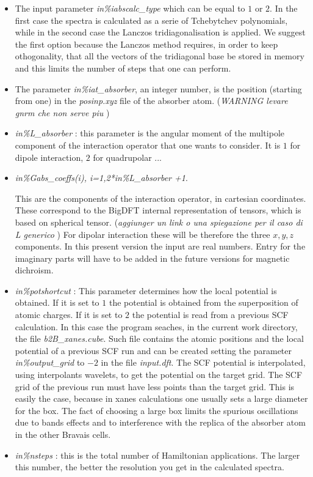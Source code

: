 \documentclass[a4paper,11pt]{report}
\begin{document}
\begin{itemize}
\item The input parameter {\it in\%iabscalc\_type} which can be equal to  $1$
or $2$. In the first case the spectra is calculated as a serie of
Tchebytchev polynomials, while in the second case the Lanczos
tridiagonalisation is applied. We suggest the first option
because the Lanczos method requires, in order to keep othogonality,
 that all the vectors of the tridiagonal base be stored in memory
and this limits the number of steps that one can perform.

\item The  parameter {\it in\%iat\_absorber}, an integer number,
is the position (starting from one) in  the {\it posinp.xyz} file
 of the absorber atom. ({\it WARNING levare gnrm che non serve piu} )

\item  {\it in\%L\_absorber} : this parameter is the angular moment
of the multipole component of the interaction operator that 
one wants to consider. It is $1$ for dipole interaction, $2$ for
quadrupolar ...

\item {\it in\%Gabs\_coeffs(i), i=1,2*in\%L\_absorber +1}.

This are the components of the interaction operator, in cartesian
coordinates. These correspond to the BigDFT internal representation 
of tensors, which is based on spherical tensor. 
({\it aggiunger un link o una spiegazione per il caso di L  generico })
For dipolar interaction these will be therefore the three $x,y,z$
components. In this present version the input are real numbers.
Entry for the imaginary parts will have to be added in the future versions 
for magnetic dichroism.

\item   {\it in\%potshortcut } : This parameter determines how the 
local potential is obtained. If it is set to $1$ the potential is
obtained from the superposition of atomic charges.
If it is set to $2$ the potential is read from a previous SCF
calculation. In this case the program seaches, in the current work directory,
the file {\it b2B\_xanes.cube}. Such file contains the atomic positions
and the local potential of a previous SCF run and can be created
setting the parameter {\it in\%output\_grid} to $-2$ in
the file {\it input.dft}. The SCF potential is interpolated, using
interpolants wavelets, to get the potential on the target grid.
The SCF grid of the previous run must have less points than the target
grid.
This is easily the case, because in xanes calculations one usually
sets a large diameter for the box. The fact of choosing a large box 
 limits the spurious oscillations due to bands effects and to interference with the replica
of the absorber atom in the other Bravais cells. 

\item {\it in\%nsteps } : this is the total number of Hamiltonian
  applications. The larger this number, the better the resolution you get
  in the calculated spectra.

\end{itemize}
\end{document}
